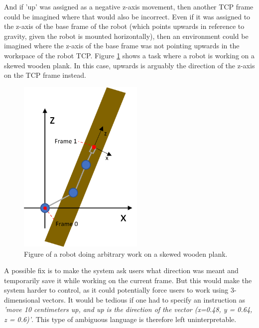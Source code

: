 And if 'up' was assigned as a negative z-axis movement, then another TCP frame could be imagined where that would also be incorrect.
Even if it was assigned to the z-axis of the base frame of the robot (which points upwards in reference to gravity, given the robot is mounted horizontally), then an environment could be imagined where the z-axis of the base frame was not pointing upwards in the workspace of the robot TCP. Figure \ref{fig:exception_frame_TCP} shows a task where a robot is working on a skewed wooden plank. In this case, upwards is arguably the direction of the z-axis on the TCP frame instead.

\begin{figure}[ht]
    \centering
    \includegraphics[width=6cm]{img/example_up_in_workspace.png}
    \caption{Figure of a robot doing arbitrary work on a skewed wooden plank.}
    \label{fig:exception_frame_TCP}
\end{figure}
A possible fix is to make the system ask users what direction was meant and temporarily save it while working on the current frame. But this would make the system harder to control, as it could potentially force users to work using 3-dimensional vectors. It would be tedious if one had to specify an instruction as \textit{'move 10 centimeters up, and up is the direction of the vector (x=0.48, y = 0.64, z = 0.6)'}. This type of ambiguous language is therefore left uninterpretable.

